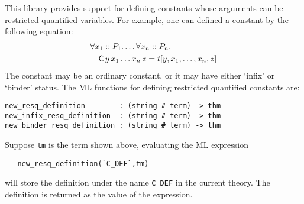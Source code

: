 This library provides support for defining constants whose arguments
can be restricted quantified variables. For example, one can defined a constant
 by the following equation:
\begin{eqnarray*}
\lefteqn{\forall x_1::P_1. \ldots \forall x_n::P_n.} \\
 & &  \mbox{{\sf C}}\, y\, x_1 \ldots x_n\, z = t[y,x_1,\ldots,x_n,z]
\end{eqnarray*}
The constant  may be an ordinary constant, or it may have
either `infix' or `binder' status. The ML functions for defining
restricted quantified constants are:
\begin{boxed}
\begin{verbatim}
new_resq_definition        : (string # term) -> thm
new_infix_resq_definition  : (string # term) -> thm
new_binder_resq_definition : (string # term) -> thm
\end{verbatim}
\end{boxed}
Suppose {\tt tm} is the term shown above, evaluating the ML expression
\begin{verbatim}
   new_resq_definition(`C_DEF`,tm)
\end{verbatim}
will store the definition under
the name \verb|C_DEF| in the current theory. The definition is
returned as the value of the expression.


